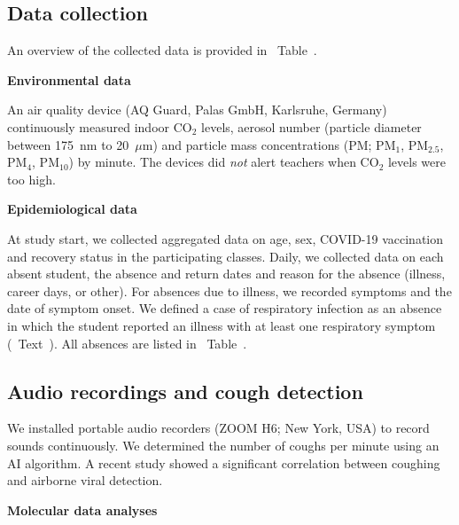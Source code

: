 \documentclass[fleqn,11pt]{wlscirep}
\begin{document}
\subsection*{Data collection}

An overview of the collected data is provided in \supp~Table~. \medskip

\noindent\textbf{Environmental data} \smallskip

\noindent An air quality device (AQ Guard, Palas GmbH, Karlsruhe, Germany) continuously measured indoor CO$_2$ levels, aerosol number (particle diameter between 175~nm to 20~$\mu$m) and particle mass concentrations (PM; PM$_1$, PM$_{2.5}$, PM$_4$, PM$_{10}$) by minute\cite{Banholzer2023PLoSMed}. The devices did \emph{not} alert teachers when CO$_2$ levels were too high. \medskip %

\noindent\textbf{Epidemiological data} \smallskip

\noindent At study start, we collected aggregated data on age, sex, COVID-19 vaccination and recovery status in the participating classes. Daily, we collected data on each absent student, \ie the absence and return dates and reason for the absence (illness, career days, or other). For absences due to illness, we recorded symptoms and the date of symptom onset. We defined a case of respiratory infection as an absence in which the student reported an illness with at least one respiratory symptom (\supp~Text~). All absences are listed in \supp~Table~.\medskip %

\subsection*{Audio recordings and cough detection}

We installed portable audio recorders (ZOOM H6; New York, USA) to record sounds continuously. We determined the number of coughs per minute using an AI algorithm\cite{Bertschinger2023IEEE}. A recent study showed a significant correlation between coughing and airborne viral detection\cite{Hanna2023PONE}.\medskip

\noindent\textbf{Molecular data analyses} \smallskip
\end{document}
